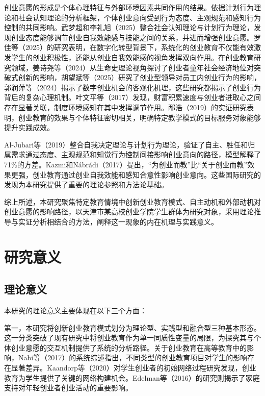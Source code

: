 创业意愿的形成是个体心理特征与外部环境因素共同作用的结果。依据计划行为理论\cite{Ajzen1991}和社会认知理论\cite{Bandura1986}的分析框架，个体创业意向受到行为态度、主观规范和感知行为控制的共同影响。武梦超和李礼旭\nolinebreak[3]（2025）整合社会认知理论与计划行为理论，发现创业态度能够调节创业自我效能感与技能之间的关系，并进而增强创业意愿\cite{wumengchao2025}。罗佳等\nolinebreak[3]（2025）的研究表明，在数字化转型背景下，系统化的创业教育不仅能有效激发学生的创业积极性，还能从创业自我效能感的视角发挥双向作用\cite{luojia2025}。在创业教育研究领域，姜诗尧等\nolinebreak[3]（2024）从生命史理论视角探讨了创业者童年社会经济地位对突破式创新的影响\cite{jiangshiyao2024}，胡望斌等\nolinebreak[3]（2025）研究了创业型领导对员工内创业行为的影响\cite{huwangbin2025}，郭润萍等\nolinebreak[3]（2024）揭示了数字创业机会的客观化机理\cite{guorunping2024}，这些研究都揭示了创业行为背后的复杂心理机制。叶文平等\nolinebreak[3]（2017）发现，财富积累速度与创业者进取心之间存在显著关联，制度环境感知在其中发挥调节作用\cite{yewenping2017}。邴浩\nolinebreak[3]（2019）的实证研究表明，创业教育的效果与个体特征密切相关，明确特定教学模式的目标服务对象能够提升实践成效\cite{binghao2019}。

Al-Jubari等\nolinebreak[3]（2019）整合自我决定理论与计划行为理论，验证了自主、胜任和归属需求通过态度、主观规范和知觉行为控制间接影响创业意向的路径，模型解释了71\%的方差\cite{AlJubari2019}。Kazmi和Nábrádi\nolinebreak[3]（2017）提出，\nolinebreak[3]“为创业而教”比\nolinebreak[3]“关于创业而教”效果更强，创业教育通过创业自我效能和感知合意性影响创业意向\cite{Kazmi2017}。这些国际研究的发现为本研究提供了重要的理论参照和方法论基础。

综上所述，本研究聚焦特定教育情境中创新创业教育模式、自主动机和外部动机对创业意愿的影响路径，以天津市某高校创业学院学生群体为研究对象，采用理论推导与实证分析相结合的方法，阐释这一现象的内在机理与实践意义。

\section{研究意义}

\subsection{理论意义}

本研究的理论意义主要体现在以下三个方面：

第一，本研究将创新创业教育模式划分为理论型、实践型和融合型三种基本形态。这一分类突破了现有研究中将创业教育作为单一同质性变量的局限，为探究其与个体创业意愿的交互机制提供了系统的分析路径。关于创业教育在高等教育中的影响，Nabi等\nolinebreak[3]（2017）的系统综述指出，不同类型的创业教育项目对学生的影响存在显著差异\cite{Nabi2017}。Kaandorp等\nolinebreak[3]（2020）对学生创业者的初始网络过程研究发现，创业教育为学生提供了关键的网络构建机会\cite{Kaandorp2020}。Edelman等\nolinebreak[3]（2016）的研究则揭示了家庭支持对年轻创业者创业活动的重要影响\cite{Edelman2016}。

